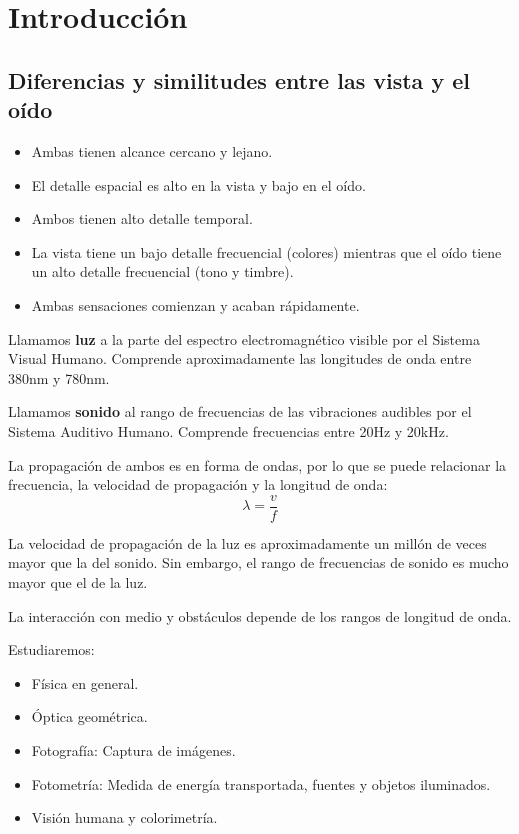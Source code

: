 \documentclass[a4paper]{book}
\begin{document}
\section{Introducción}

\subsection{Diferencias y similitudes entre las vista y el oído}
\begin{itemize}
	 \item Ambas tienen alcance cercano y lejano.
	 \item El detalle espacial es alto en la vista y bajo en el oído.
	 \item Ambos tienen alto detalle temporal.
	 \item La vista tiene un bajo detalle frecuencial (colores) mientras que el oído tiene un alto detalle frecuencial (tono y timbre).
	 \item Ambas sensaciones comienzan y acaban rápidamente.
\end{itemize}

Llamamos \textbf{luz} a la parte del espectro electromagnético visible por el Sistema Visual Humano. Comprende aproximadamente las longitudes de onda entre 380nm y 780nm.

Llamamos \textbf{sonido} al rango de frecuencias de las vibraciones audibles por el Sistema Auditivo Humano. Comprende frecuencias entre 20Hz y 20kHz.

La propagación de ambos es en forma de ondas, por lo que se puede relacionar la frecuencia, la velocidad de propagación y la longitud de onda:
\[ \lambda = \frac{v}{f}  \]

La velocidad de propagación de la luz es aproximadamente un millón de veces mayor que la del sonido. Sin embargo, el rango de frecuencias de sonido es mucho mayor que el de la luz.

La interacción con medio y obstáculos depende de los rangos de longitud de onda.

Estudiaremos:
\begin{itemize}
	 \item Física en general.
	 \item Óptica geométrica.
	 \item Fotografía: Captura de imágenes.
	 \item Fotometría: Medida de energía transportada, fuentes y objetos iluminados.
	 \item Visión humana y colorimetría.
\end{itemize}
\end{document}
